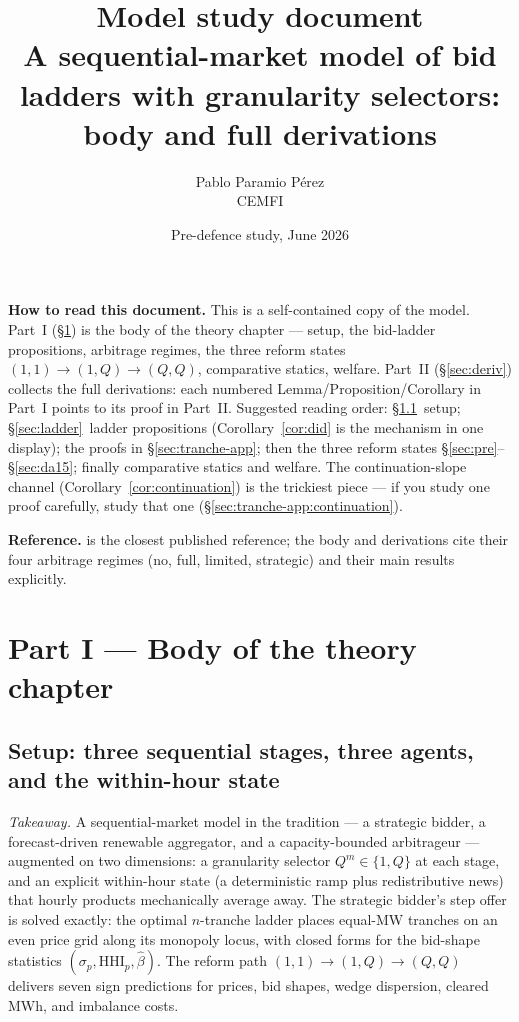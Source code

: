 \documentclass[11pt,a4paper]{article}
\title{Model study document\\
       \large A sequential-market model of bid ladders with granularity selectors:\\
       \large body and full derivations}
\author{Pablo Paramio P\'erez\\ CEMFI}
\date{Pre-defence study, June 2026}
\theoremstyle{definition}
\theoremstyle{remark}
\theoremstyle{plain}
\begin{document}
\maketitle

\noindent\textbf{How to read this document.} This is a self-contained copy of the model. Part~I (\S\ref{sec:body}) is the body of the theory chapter --- setup, the bid-ladder propositions, arbitrage regimes, the three reform states $(1,1)\to(1,Q)\to(Q,Q)$, comparative statics, welfare. Part~II (\S\ref{sec:deriv}) collects the full derivations: each numbered Lemma/Proposition/Corollary in Part~I points to its proof in Part~II. Suggested reading order: \S\ref{sec:setup}~setup; \S\ref{sec:ladder}~ladder propositions (Corollary~\ref{cor:did} is the mechanism in one display); the proofs in \S\ref{sec:tranche-app}; then the three reform states \S\ref{sec:pre}--\S\ref{sec:da15}; finally comparative statics and welfare. The continuation-slope channel (Corollary~\ref{cor:continuation}) is the trickiest piece --- if you study one proof carefully, study that one (\S\ref{sec:tranche-app:continuation}).

\noindent\textbf{Reference.} \citet{ito_reguant_2016} is the closest published reference; the body and derivations cite their four arbitrage regimes (no, full, limited, strategic) and their main results explicitly.

\tableofcontents

\clearpage

\section{Part I --- Body of the theory chapter}\label{sec:body}

\subsection{Setup: three sequential stages, three agents, and the within-hour state}\label{sec:setup}

\emph{Takeaway.} A sequential-market model in the \citet{ito_reguant_2016} tradition --- a strategic bidder, a forecast-driven renewable aggregator, and a capacity-bounded arbitrageur --- augmented on two dimensions: a granularity selector $Q^m \in \{1, Q\}$ at each stage, and an explicit within-hour state (a deterministic ramp plus redistributive news) that hourly products mechanically average away. The strategic bidder's step offer is solved exactly: the optimal $n$-tranche ladder places equal-MW tranches on an even price grid along its monopoly locus, with closed forms for the bid-shape statistics $(\sigma_p, \text{HHI}_p, \hat\beta)$. The reform path $(1,1)\to(1,Q)\to(Q,Q)$ delivers seven sign predictions for prices, bid shapes, wedge dispersion, cleared MWh, and imbalance costs.
\end{document}

